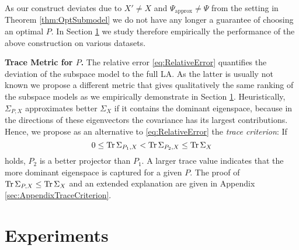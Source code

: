 As our construct deviates due to $X'\neq X$ and $\Psi_{\mathrm{approx}}\neq \Psi$ from the setting in Theorem \ref{thm:OptSubmodel} we do not have any longer a guarantee of choosing an optimal $P$. In Section \ref{sec:Experiment} we study therefore empirically the performance of the above construction on various datasets. 

\textbf{Trace Metric for $P$.} The relative error \eqref{eq:RelativeError} quantifies the deviation of the subspace model to the full LA. As the latter is usually not known we propose a different metric that gives qualitatively the same ranking of the subspace models as we empirically demonstrate in Section \ref{sec:Experiment}. Heuristically, $\Sigma_{P,X}$ approximates better $\Sigma_X$ if it contains the dominant eigenspace, because in the directions of these eigenvectors the covariance has its largest contributions. Hence, we propose as an alternative to \eqref{eq:RelativeError} the \emph{trace criterion}: If 
\begin{equation}
    \label{eq:TraceOrderMain}
    0 \leq \operatorname{Tr} \Sigma_{P_1,X} < \operatorname{Tr} \Sigma_{P_2,X} \leq \operatorname{Tr} \Sigma_{X}
\end{equation}
holds, $P_2$ is a better projector than $P_1$. A larger trace value indicates that the more dominant eigenspace is captured for a given $P$. The proof of $\operatorname{Tr} \Sigma_{P,X} \leq \operatorname{Tr} \Sigma_X$ and an extended explanation are given in Appendix \ref{sec:AppendixTraceCriterion}. 
 

\section{Experiments}
    \label{sec:Experiment}


